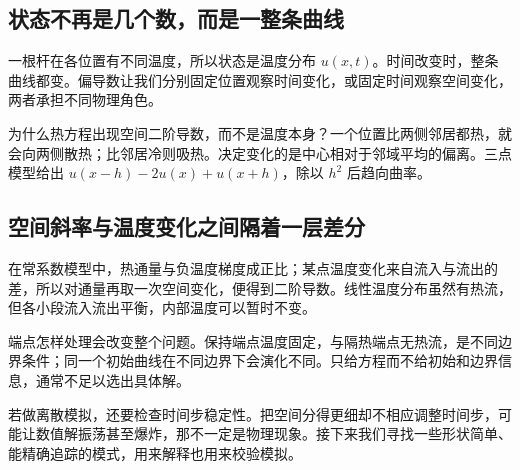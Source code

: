 \subsection*{状态不再是几个数，而是一整条曲线}
一根杆在各位置有不同温度，所以状态是温度分布 $u(x,t)$。时间改变时，整条曲线都变。偏导数让我们分别固定位置观察时间变化，或固定时间观察空间变化，两者承担不同物理角色。

为什么热方程出现空间二阶导数，而不是温度本身？一个位置比两侧邻居都热，就会向两侧散热；比邻居冷则吸热。决定变化的是中心相对于邻域平均的偏离。三点模型给出 $u(x-h)-2u(x)+u(x+h)$，除以 $h^2$ 后趋向曲率。

\subsection*{空间斜率与温度变化之间隔着一层差分}
在常系数模型中，热通量与负温度梯度成正比；某点温度变化来自流入与流出的差，所以对通量再取一次空间变化，便得到二阶导数。线性温度分布虽然有热流，但各小段流入流出平衡，内部温度可以暂时不变。

端点怎样处理会改变整个问题。保持端点温度固定，与隔热端点无热流，是不同边界条件；同一个初始曲线在不同边界下会演化不同。只给方程而不给初始和边界信息，通常不足以选出具体解。

若做离散模拟，还要检查时间步稳定性。把空间分得更细却不相应调整时间步，可能让数值解振荡甚至爆炸，那不一定是物理现象。接下来我们寻找一些形状简单、能精确追踪的模式，用来解释也用来校验模拟。
